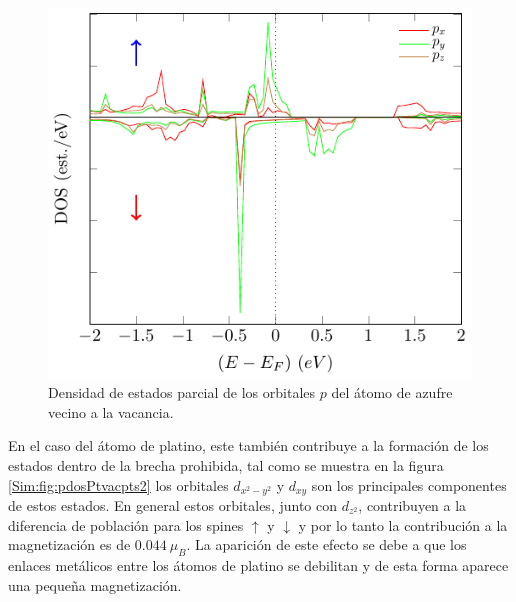 \begin{figure}[!hbt]
	\centering
	\includegraphics[scale=1]{figRes/PtS2/def/bandas/nosoc/pdosS_neg.pdf}
	\caption[Densidad de estados proyectada en los orbitales $p$ del \'atomo de Azufre vecino a la vacancia en el PtS\textsubscript{2} con una vacancia de Platino.]{Densidad de estados parcial de los orbitales $p$ del \'atomo de azufre vecino a la vacancia.}
	\label{Sim:fig:pdosSvacpts2}
\end{figure}
\newline
En el caso del \'atomo de platino, este  tambi\'en contribuye a la formaci\'on de los estados dentro de la brecha prohibida, tal como se muestra en la figura \ref{Sim:fig:pdosPtvacpts2} los orbitales $d_{x^2-y^2}$ y $d_{xy}$ son los principales componentes de estos estados. En general estos orbitales, junto con $d_{z^2}$,  contribuyen a la diferencia de poblaci\'on  para los spines $\uparrow$ y $\downarrow$ y  por lo tanto la contribuci\'on a la magnetizaci\'on es de $0.044 ~ \mu_B$. La aparici\'on de este efecto se debe a que los enlaces met\'alicos entre los \'atomos de platino se debilitan y de esta forma aparece una peque\~na magnetizaci\'on.

